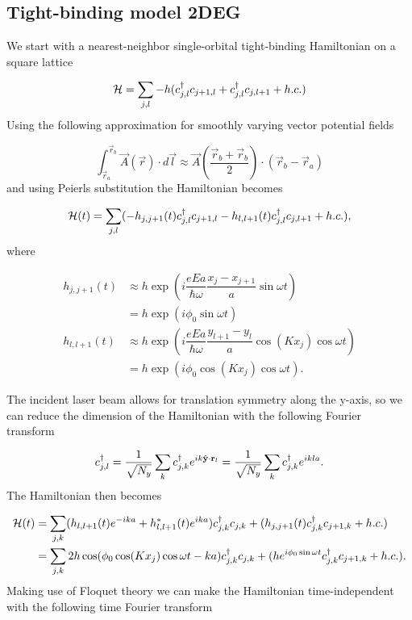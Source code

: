 \subsection{Tight-binding model 2DEG}

We start with a nearest-neighbor single-orbital tight-binding Hamiltonian on a square lattice

\begin{equation}
  \mathcal{H} = \sum_{j,l} -h (c^{\dagger}_{j,l} c_{j+1,l} + c^{\dagger}_{j,l} c_{j,l+1} + h.c.)
\end{equation}
Using the following approximation for smoothly varying vector potential fields

\begin{equation}
  \int_{\vec{r}_a}^{\vec{r}_b} \vec{A}(\vec{r}) \cdot d\vec{l} \approx \vec{A} \left( \dfrac{\vec{r}_b+\vec{r}_b}{2} \right) \cdot (\vec{r}_b - \vec{r}_a)
\end{equation}
and using Peierls substitution the Hamiltonian becomes

\begin{equation}
  \mathcal{H}(t) = \sum_{j,l} (-h_{j,j+1}(t) c^{\dagger}_{j,l} c_{j+1,l} - h_{l,l+1}(t) c^{\dagger}_{j,l} c_{j,l+1} + h.c.),
\end{equation}
where

\begin{align}
  h_{j,j+1}(t) &\approx h \exp\left(i \dfrac{eEa}{\hbar \omega} \dfrac{x_j-x_{j+1}}{a} \sin \omega t\right) \nonumber \\
  &= h \exp\left(i \phi_0 \sin \omega t\right) \\
  h_{l,l+1}(t) &\approx h \exp\left(i \dfrac{eEa}{\hbar \omega} \dfrac{y_{l+1}-y_l}{a} \cos(Kx_j)\cos \omega t\right) \nonumber \\
  &= h \exp\left(i \phi_0 \cos(Kx_j)\cos \omega t\right).
\end{align}

The incident laser beam allows for translation symmetry along the y-axis, so we can reduce the dimension of the Hamiltonian with the following Fourier transform

\begin{equation}
  \cc_{j,l} = \dfrac{1}{\sqrt{N_y}} \sum_k \cc_{j,k} e^{ik\hat{y}\cdot \vec{r}_{l}} = \dfrac{1}{\sqrt{N_y}} \sum_k \cc_{j,k} e^{ikla}.
\end{equation}
The Hamiltonian then becomes

\begin{align}
  \mathcal{H}(t) &= \sum_{j,k} ( h_{l,l+1}(t) e^{-ika} + h_{l,l+1}^*(t) e^{ika}) c^{\dagger}_{j,k} c_{j,k} + (h_{j,j+1}(t) c^{\dagger}_{j,k} c_{j+1,k} + h.c.) \\
  &= \sum_{j,k} 2h\cos( \phi_0 \cos(Kx_j) \cos \omega t - ka ) c^{\dagger}_{j,k} c_{j,k} + (h e^{i\phi_0 \sin \omega t} c^{\dagger}_{j,k} c_{j+1,k} + h.c.).
\end{align}
Making use of Floquet theory we can make the Hamiltonian time-independent with the following time Fourier transform

